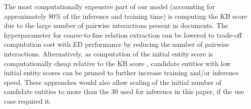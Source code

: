 \documentclass[11pt]{article}
\begin{document}
\begin{table}[h]
	\centering
	\caption{Time taken in seconds for EL inference on AIDA-CoNLL test dataset.}\label{time_taken}
	\label{tab:inference-speed-test}

\end{table}

The most computationally expensive part of our model (accounting for approximately 80\% of the inference and training time) is computing the KB score due to the large number of pairwise interactions present in documents. The hyperparameter for coarse-to-fine relation extraction can be lowered to trade-off computation cost with ED performance by reducing the number of pairwise interactions. Alternatively, as computation of the initial entity score  is computationally cheap relative to the KB score , candidate entities with low initial entity scores can be pruned to further increase training and/or inference speed. These approaches would also allow scaling of the initial number of candidate entities to more than the 30 used for inference in this paper, if the use case required it.  
\end{document}
